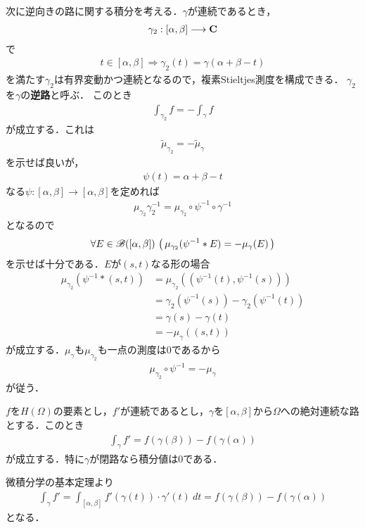 	次に逆向きの路に関する積分を考える．$\gamma$が連続であるとき，
	\begin{align}
		\gamma_2 : [\alpha,\beta] \longrightarrow \mathbf{C}
	\end{align}
	で
	\begin{align}
		t \in [\alpha, \beta] \Longrightarrow \gamma_2(t) = \gamma(\alpha + \beta - t) 
	\end{align}
	を満たす$\gamma_2$は有界変動かつ連続となるので，複素Stieltjes測度を構成できる．
	$\gamma_2$を$\gamma$の{\bf 逆路}と呼ぶ．
	このとき
	\begin{align}
		\int_{\gamma_2} f = - \int_\gamma f
	\end{align}
	が成立する．これは
	\begin{align}
		\tilde{\mu}_{\gamma_2} = - \tilde{\mu}_\gamma 
	\end{align}
	を示せば良いが，
	\begin{align}
		\psi(t) = \alpha + \beta - t
	\end{align}
	なる$\psi:[\alpha,\beta] \longrightarrow [\alpha,\beta]$を定めれば
	\begin{align}
		\mu_{\gamma_2} \gamma_2^{-1} = \mu_{\gamma_2} \circ \psi^{-1} \circ \gamma^{-1}
	\end{align}
	となるので
	\begin{align}
		\forall E \in \mathscr{B}([\alpha,\beta])\,
		\left(\, \mu_{\gamma_2}(\psi^{-1} \ast E) = -\mu_\gamma(E)\, \right)
	\end{align}
	を示せば十分である．$E$が$(s,t)$なる形の場合
	\begin{align}
		\mu_{\gamma_2}\left(\psi^{-1} \ast (s,t)\right)
		&= \mu_{\gamma_2}\left( \left( \psi^{-1}(t),\psi^{-1}(s) \right) \right) \\
		&= \gamma_2\left(\psi^{-1}(s)\right) - \gamma_2\left(\psi^{-1}(t)\right) \\
		&= \gamma(s) - \gamma(t) \\
		&= -\mu_\gamma((s,t))
	\end{align}
	が成立する．$\mu_\gamma$も$\mu_{\gamma_2}$も一点の測度は$0$であるから
	\begin{align}
		\mu_{\gamma_2} \circ \psi^{-1} = -\mu_\gamma
	\end{align}
	が従う．
	
	\begin{screen}
		\begin{thm}[正則関数に対する微積分学の基本定理]
			$f$を$H(\Omega)$の要素とし，$f'$が連続であるとし，$\gamma$を$[\alpha,\beta]$から$\Omega$への絶対連続な路とする．このとき
			\begin{align}
				\int_{\gamma} f' = f(\gamma(\beta)) - f(\gamma(\alpha))
			\end{align}
			が成立する．特に$\gamma$が閉路なら積分値は$0$である．
		\end{thm}
	\end{screen}
	
	\begin{prf}
		微積分学の基本定理より
		\begin{align}
			\int_{\gamma} f'
			= \int_{[\alpha,\beta]} f'(\gamma(t)) \cdot \gamma'(t)\ dt
			= f(\gamma(\beta)) - f(\gamma(\alpha))
		\end{align}
		となる．
		\QED
	\end{prf}